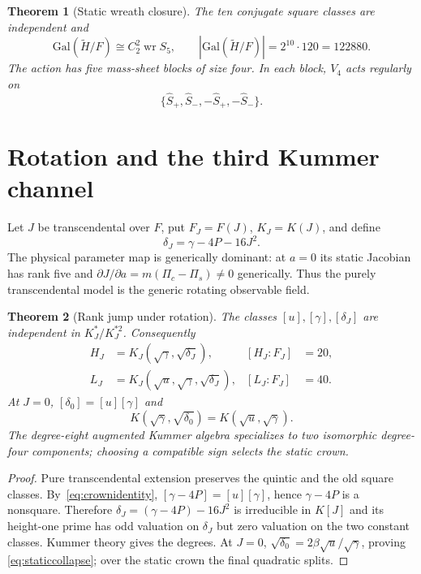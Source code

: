 \documentclass[11pt]{article}
\newtheorem{theorem}{Theorem}[section]
\theoremstyle{definition}
\theoremstyle{remark}
\newcommand{\Gal}{\mathrm{Gal}}
\newcommand{\wrp}{\mathop{\mathrm{wr}}}
\begin{document}
\begin{theorem}[Static wreath closure]
\label{thm:staticwreath}
The ten conjugate square classes are independent and
\begin{equation}
\Gal(\widetilde H/F)\cong C_2^2\wrp S_5,\qquad
|\Gal(\widetilde H/F)|=2^{10}\cdot120=122880.
\end{equation}
The action has five mass-sheet blocks of size four.  In each block, $V_4$
acts regularly on
\begin{equation*}
\{\widehat S_+,\widehat S_-,-\widehat S_+,-\widehat S_-\}.
\end{equation*}
\end{theorem}

\section{Rotation and the third Kummer channel}
\label{sec:rotation}

Let $J$ be transcendental over $F$, put $F_J=F(J)$, $K_J=K(J)$, and define
\begin{equation}
\delta_J=\gamma-4P-16J^2.
\label{eq:deltaj}
\end{equation}
The physical parameter map is generically dominant: at $a=0$ its static
Jacobian has rank five and
$\partial J/\partial a=m(\Pi_c-\Pi_s)\ne0$ generically.  Thus the purely
transcendental model is the generic rotating observable field.

\begin{theorem}[Rank jump under rotation]
\label{thm:rankjump}
The classes $[u],[\gamma],[\delta_J]$ are independent in
$K_J^*/K_J^{*2}$.  Consequently
\begin{align}
H_J&=K_J(\sqrt\gamma,\sqrt{\delta_J}), & [H_J:F_J]&=20,\\
L_J&=K_J(\sqrt u,\sqrt\gamma,\sqrt{\delta_J}), & [L_J:F_J]&=40.
\end{align}
At $J=0$, $[\delta_0]=[u][\gamma]$ and
\begin{equation}
K(\sqrt\gamma,\sqrt{\delta_0})=K(\sqrt u,\sqrt\gamma).
\label{eq:staticcollapse}
\end{equation}
The degree-eight augmented Kummer algebra specializes to two isomorphic
degree-four components; choosing a compatible sign selects the static crown.
\end{theorem}

\begin{proof}
Pure transcendental extension preserves the quintic and the old square
classes. By~\eqref{eq:crownidentity},
$[\gamma-4P]=[u][\gamma]$, hence $\gamma-4P$ is a nonsquare. Therefore
$\delta_J=(\gamma-4P)-16J^2$ is irreducible in $K[J]$ and its height-one
prime has odd valuation on $\delta_J$ but zero valuation on the two constant
classes. Kummer theory gives the degrees. At $J=0$,
$\sqrt{\delta_0}=2\beta\sqrt u/\sqrt\gamma$, proving
\eqref{eq:staticcollapse}; over the static crown the final quadratic splits.
\end{proof}
\end{document}
